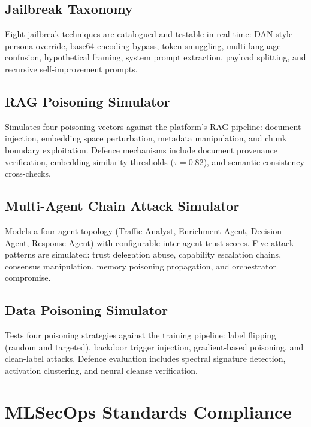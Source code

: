 \documentclass[11pt,a4paper]{article}
\begin{document}
\subsection{Jailbreak Taxonomy}
Eight jailbreak techniques are catalogued and testable in real time:
DAN-style persona override, base64 encoding bypass, token smuggling,
multi-language confusion, hypothetical framing, system prompt extraction,
payload splitting, and recursive self-improvement prompts.

\subsection{RAG Poisoning Simulator}
Simulates four poisoning vectors against the platform's RAG pipeline:
document injection, embedding space perturbation, metadata manipulation,
and chunk boundary exploitation.  Defence mechanisms include document
provenance verification, embedding similarity thresholds ($\tau = 0.82$),
and semantic consistency cross-checks.

\subsection{Multi-Agent Chain Attack Simulator}
Models a four-agent topology (Traffic Analyst, Enrichment Agent, Decision
Agent, Response Agent) with configurable inter-agent trust scores.  Five
attack patterns are simulated: trust delegation abuse, capability escalation
chains, consensus manipulation, memory poisoning propagation, and
orchestrator compromise.

\subsection{Data Poisoning Simulator}
Tests four poisoning strategies against the training pipeline: label flipping
(random and targeted), backdoor trigger injection, gradient-based poisoning,
and clean-label attacks.  Defence evaluation includes spectral signature
detection, activation clustering, and neural cleanse verification.

\section{MLSecOps Standards Compliance}
\label{sec:mlsecops}
\end{document}

